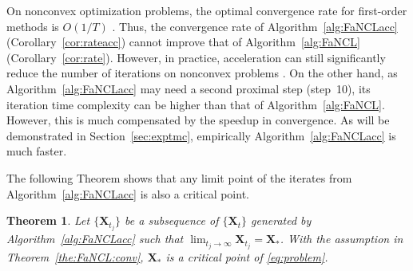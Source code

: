 \documentclass[10pt,journal,compsoc]{IEEEtran}
\newtheorem{theorem}{Theorem}[section]
\newcommand{\X}{\mathbf{X}}
\begin{document}
On nonconvex optimization problems, the optimal convergence rate  for first-order methods is
$O(1/T)$ \cite{ghadimi2016accelerated}.  Thus, the convergence rate
of Algorithm~\ref{alg:FaNCLacc} (Corollary~\ref{cor:rateacc}) cannot improve that of
Algorithm~\ref{alg:FaNCL}
(Corollary~\ref{cor:rate}).
However, in practice,
acceleration can still significantly reduce the number of iterations 
on nonconvex problems 
\cite{li2015accelerated,ghadimi2016accelerated}.
On the other hand, as Algorithm~\ref{alg:FaNCLacc} may need a second proximal step 
(step~10), its iteration time complexity can be higher than that of Algorithm~\ref{alg:FaNCL}. 
However, this is much compensated by the speedup in convergence.
As will be demonstrated in Section~\ref{sec:exptmc},
empirically 
Algorithm~\ref{alg:FaNCLacc} is much faster.

The following Theorem shows  that
any limit point of the iterates from
Algorithm~\ref{alg:FaNCLacc} 
is also a critical point.

\begin{theorem} \label{thm:critacc}
Let $\{ \X_{t_j} \}$ be
a subsequence of $\{ \X_t \}$ generated by Algorithm~\ref{alg:FaNCLacc} such that
$\lim_{t_j \rightarrow \infty} \X_{t_j} = \X_*$.
With the assumption in Theorem~\ref{the:FaNCL:conv},
$\X_*$ is a critical point of \eqref{eq:problem}.
\end{theorem}

\end{document}

